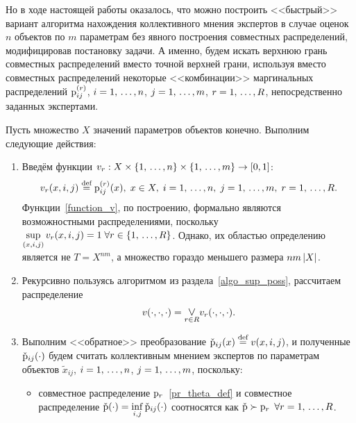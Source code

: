 Но в ходе настоящей работы оказалось, что можно построить <<быстрый>> вариант алгоритма нахождения коллективного мнения экспертов в случае оценок $n$ объектов по $m$ параметрам без явного построения совместных распределений, модифицировав постановку задачи. А именно, будем искать верхнюю грань совместных распределений вместо точной верхней грани, используя вместо совместных распределений некоторые <<комбинации>> маргинальных распределений ${\mathrm{p}}_{ij}^{(r)}$, $i=1,\, \ldots, n$, $j=1,\, \ldots, m$,  $r=1,\, \ldots, R$, непосредственно заданных экспертами. %

Пусть множество $X$ значений параметров объектов конечно. %
Выполним следующие действия:
\begin{enumerate}
	\item\label{quickwg-1} Введём функции $v_r: X \times \{1,\, \ldots, n\} \times \{1,\, \ldots, m\} \rightarrow [0,1]$:
		  \begin{equation}
		      \label{function_v}
		      v_r(x, i, j) \overset{\text{def}}{=} {\mathrm{p}}_{ij}^{(r)}(x),\; x \in X, \; i = 1,\, \ldots, n,\; j = 1,\, \ldots, m,\; r = 1,\, \ldots, R.
		  \end{equation}
		  Функции~\eqref{function_v}, по построению, формально являются возможностными распределениями, поскольку $  \underset{(x,i,j)} \sup \,v_r(x,i,j) = 1\; \forall r \in \{1,\, \ldots, R\}$. Однако, их областью определению является не $T = X^{nm}$, а множество гораздо меньшего размера $nm\left| X \right|$.
	\item\label{quickwg-2} Рекурсивно пользуясь алгоритмом из раздела~\ref{algo_sup_poss}, рассчитаем распределение 
	\begin{equation*}	
	\label{vsuprem}
	      v\tcd = \underset{r \in R} {\mathlarger \vee}  v_r\tcd.
	\end{equation*}	
	\item\label{quickwg-3} Выполним <<обратное>> преобразование $\check{{\mathrm{p}}}_{ij}(x) \overset{\text{def}}{=} v(x, i,j)$, и полученные $\check{{\mathrm{p}}}_{ij}(\cdot)$ будем  считать коллективным мнением экспертов по параметрам объектов $\tilde x_{ij}$, $i = 1,\, \ldots, n$, $j = 1,\, \ldots, m$, поскольку: 
	\begin{itemize}
	    \item
	    совместное распределение ${\mathrm{p}}_r$~\eqref{pr_theta_def} %
	    и совместное распределение $\check{{\mathrm{p}}}(\cdot) = \underset{i,j}\inf\, \check{{\mathrm{p}}}_{ij}(\cdot)$ соотносятся как $\check{{\mathrm{p}}} \succ {\mathrm{p}}_r$  $\forall r = 1,\, \ldots, R$. 

\end{itemize}
\end{enumerate}
